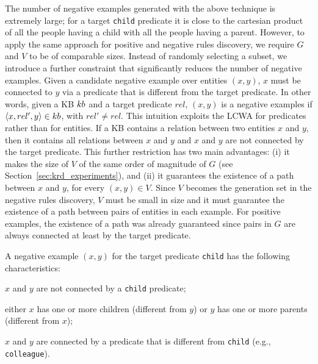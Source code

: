 The number of negative examples generated with the above technique is extremely large; for a target \texttt{child} predicate it is close to the cartesian product of all the people having a child with all the people having a parent. 
However, to apply the same approach for positive and negative rules discovery, we require $G$ and $V$ to be of comparable sizes. 
Instead of randomly selecting a subset, we introduce a further constraint that significantly reduces the number of negative examples. Given a candidate negative example over entities $(x,y)$, $x$ must be connected to $y$ via a predicate that is different from the target predicate. In other words, given a KB ${\sc kb}$ and a target predicate $rel$, $(x,y)$ is a negative examples if $\langle x,rel',y\rangle \in {\sc kb}$, with $rel' \neq rel$. This intuition exploits the LCWA for predicates rather than for entities. If a KB contains a relation between two entities $x$ and $y$, then it contains all relations between $x$ and $y$
and $x$ and $y$ are not connected by the target predicate. %
This further restriction has two main advantages: 
(i) it makes the size of $V$ of the same order of magnitude of $G$ (see Section~\ref{sec:krd_experiments}), and 
(ii) it guarantees the existence of a path between $x$ and $y$, for every $(x,y) \in V$. 
Since $V$ becomes the generation set in the negative rules discovery, $V$ must be small in size and it must guarantee the existence of a path between pairs of entities in each example. 
For positive examples, the existence of a path was already guaranteed since pairs in $G$ are always connected at least by the target predicate.



\begin{example}
A negative example $(x,y)$ for the target predicate \texttt{child} has the following characteristics:
\begin{inparaenum}[\itshape(i)]
	\item $x$ and $y$ are not connected by a \texttt{child} predicate;
	\item either $x$ has one or more children (different from $y$) or $y$ has one or more parents (different from $x$);
	\item $x$ and $y$ are connected by a predicate that is different from \texttt{child} (e.g., \texttt{colleague}).
\end{inparaenum}
\end{example}

